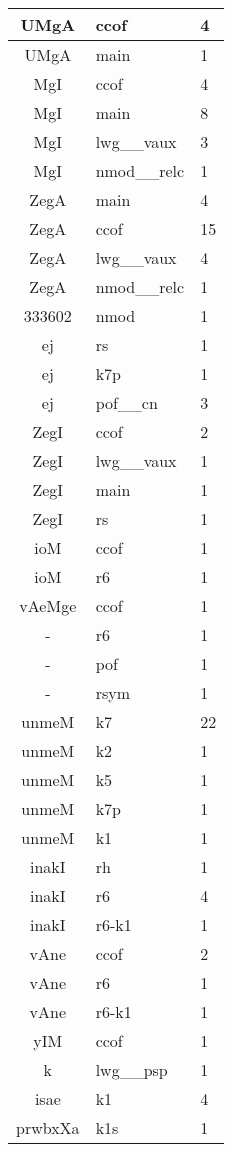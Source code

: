 \documentclass[a4 paper]{article}
\begin{document}
\begin{longtable}{cp{}p{}}
UMgA & ccof & 4\\ \midrule UMgA & main & 1\\ \midrule 
MgI & ccof & 4\\ \midrule MgI & main & 8\\ \midrule MgI & lwg\_\_vaux & 3\\ \midrule MgI & nmod\_\_relc & 1\\ \midrule 
ZegA & main & 4\\ \midrule ZegA & ccof & 15\\ \midrule ZegA & lwg\_\_vaux & 4\\ \midrule ZegA & nmod\_\_relc & 1\\ \midrule 
333602 & nmod & 1\\ \midrule 
ej & rs & 1\\ \midrule ej & k7p & 1\\ \midrule ej & pof\_\_cn & 3\\ \midrule 
ZegI & ccof & 2\\ \midrule ZegI & lwg\_\_vaux & 1\\ \midrule ZegI & main & 1\\ \midrule ZegI & rs & 1\\ \midrule 
ioM & ccof & 1\\ \midrule ioM & r6 & 1\\ \midrule 
vAeMge & ccof & 1\\ \midrule 
- & r6 & 1\\ \midrule - & pof & 1\\ \midrule - & rsym & 1\\ \midrule 
unmeM & k7 & 22\\ \midrule unmeM & k2 & 1\\ \midrule unmeM & k5 & 1\\ \midrule unmeM & k7p & 1\\ \midrule unmeM & k1 & 1\\ \midrule 
inakI & rh & 1\\ \midrule inakI & r6 & 4\\ \midrule inakI & r6-k1 & 1\\ \midrule 
vAne & ccof & 2\\ \midrule vAne & r6 & 1\\ \midrule vAne & r6-k1 & 1\\ \midrule 
yIM & ccof & 1\\ \midrule 
k & lwg\_\_psp & 1\\ \midrule 
isae & k1 & 4\\ \midrule 
prwbxXa & k1s & 1\\ \midrule 

\end{longtable}
\end{document}
